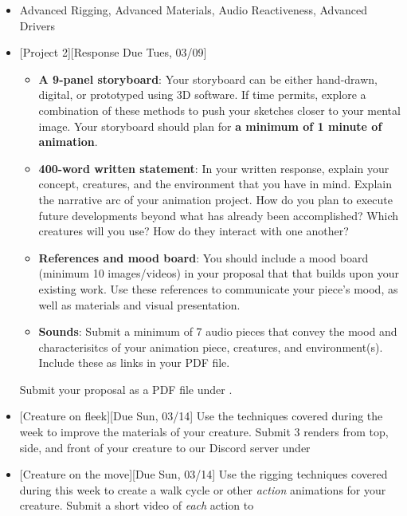 \def\dMon{Mon, 03/08}
\def\dTues{Tues, 03/09}
\def\dWed{Wed, 03/10}
\def\dThur{Thur, 03/11}
\def\dFri{Fri, 03/12}
\def\dSat{Sat, 03/13}
\def\dSun{Sun, 03/14}
\placeDate

\begin{itemize}[noitemsep,topsep=0pt,leftmargin=*]
    \item {} Advanced Rigging, Advanced Materials, Audio Reactiveness, Advanced Drivers
    \item {}[Project 2][Response Due \dTues]
          \begin{itemize}
              \item \textbf{A 9-panel storyboard}: Your storyboard can be either hand-drawn, digital, or prototyped using 3D software. If time permits, explore a combination of these methods to push your sketches closer to your mental image. Your storyboard should plan for \textbf{a minimum of 1 minute of animation}.
              \item \textbf{400-word written statement}: In your written response, explain your concept, creatures, and the environment that you have in mind. Explain the narrative arc of your animation project. How do you plan to execute future developments beyond what has already been accomplished? Which creatures will you use? How do they interact with one another?
              \item \textbf{References and mood board}: You should include a mood board (minimum 10 images/videos) in your proposal that that builds upon your existing work. Use these references to communicate your piece's mood, as well as materials and visual presentation.
              \item \textbf{Sounds}: Submit a minimum of 7 audio pieces that convey the mood and characterisitcs of your animation piece, creatures, and environment(s). Include these as links in your PDF file.
          \end{itemize}
          Submit your proposal as a PDF file under .
    \item {}[Creature on fleek][Due \dSun]
          \newline Use the techniques covered during the week to improve the materials of your creature. Submit 3 renders from top, side, and front of your creature to our Discord server under \discordC
    \item {}[Creature on the move][Due \dSun]
          \newline Use the rigging techniques covered during this week to create a walk cycle or other \emph{action} animations for your creature. Submit a short video of \emph{each} action to \discordC

\end{itemize}

